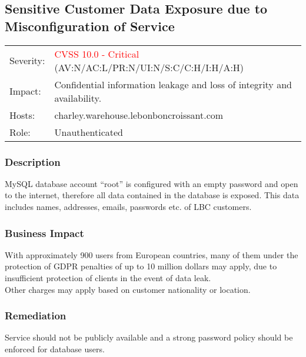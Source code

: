 \documentclass{article}
\begin{document}
\subsection{Sensitive Customer Data Exposure due to Misconfiguration of Service}\begin{table}[h]
\centering
\begin{tabular}{|l|l|}
	\rowcolor{red}
	\hline                  &                                                                             \\
	\hline Severity:        & \textcolor{red}{CVSS 10.0 - Critical} (AV:N/AC:L/PR:N/UI:N/S:C/C:H/I:H/A:H) \\
	\hline Impact:          & Confidential information leakage and loss of integrity and availability.    \\
	\hline Hosts:           & charley.warehouse.lebonboncroissant.com                                     \\
	\hline Role:            & Unauthenticated                                                             \\
	\hline
\end{tabular}
\end{table} 
\subsubsection*{Description} MySQL database account “root” is configured with an empty password and open to the internet, therefore all data contained in the database is exposed. This data includes names, addresses, emails, passwords etc. of LBC customers.
\subsubsection*{Business Impact}
 With  approximately 900 users from European countries, many of them under the protection of GDPR penalties of up to 10 million dollars may apply, due to insufficient protection of clients in the event of data leak. \\
Other charges may apply based on customer nationality or location.
\subsubsection*{Remediation}Service should not be publicly available and a strong password policy should be enforced for database users.
\end{document}
